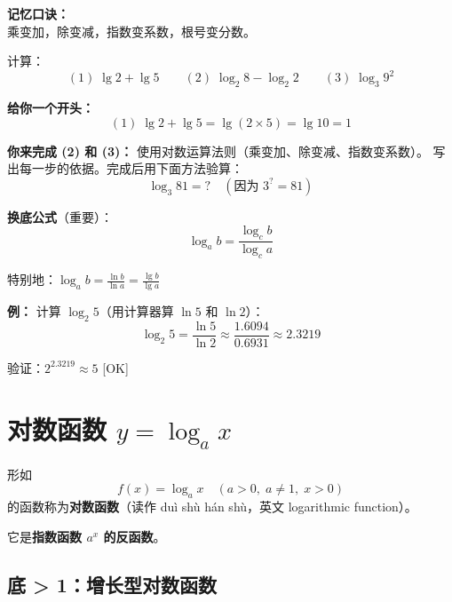 \begin{notebox}
\textbf{记忆口诀：}\\
乘变加，除变减，指数变系数，根号变分数。
\end{notebox}

\begin{examplebox}
计算：
\[
(1)\; \lg 2 + \lg 5 \qquad (2)\; \log_2 8 - \log_2 2 \qquad (3)\; \log_3 9^2
\]

\textbf{给你一个开头：}
\[
(1)\; \lg 2 + \lg 5 = \lg(2 \times 5) = \lg 10 = 1
\]

\textbf{你来完成 (2) 和 (3)：} 使用对数运算法则（乘变加、除变减、指数变系数）。
写出每一步的依据。完成后用下面方法验算：
\[
\log_3 81 = ? \quad (\text{因为 } 3^? = 81)
\]
\end{examplebox}



\begin{examplebox}[5——换底公式]
\textbf{换底公式}（重要）：
\[
\log_a b = \frac{\log_c b}{\log_c a}
\]

特别地：\(\log_a b = \frac{\ln b}{\ln a} = \frac{\lg b}{\lg a}\)

\textbf{例：} 计算 \(\log_2 5\)（用计算器算 \(\ln 5\) 和 \(\ln 2\)）：
\[
\log_2 5 = \frac{\ln 5}{\ln 2} \approx \frac{1.6094}{0.6931} \approx 2.3219
\]

验证：\(2^{2.3219} \approx 5\) [OK]
\end{examplebox}


\section{对数函数 \(y = \log_a x\)}

\begin{definitionbox}[对数函数]
形如
\[
f(x) = \log_a x \quad (a > 0,\; a \neq 1,\; x > 0)
\]
的函数称为\textbf{对数函数}（读作 duì shù hán shù，英文 logarithmic function）。

它是\textbf{指数函数 \(a^x\) 的反函数}。
\end{definitionbox}

\subsection{底 > 1：增长型对数函数}

